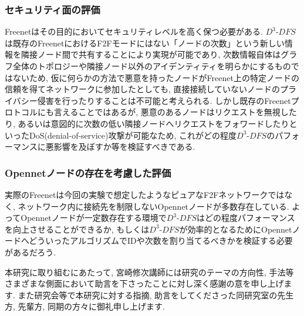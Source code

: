 \documentclass[dvipdfmx]{ampbt}
\begin{document}
\subsubsection*{セキュリティ面の評価}
Freenetはその目的においてセキュリティレベルを高く保つ必要がある. $D^3$-$DFS$は既存のFreenetにおけるF2Fモードにはない「ノードの次数」という新しい情報を隣接ノード間で共有することにより実現が可能であり, 次数情報自体はグラフ全体のトポロジーや隣接ノード以外のアイデンティティを明らかにするものではないため, 仮に何らかの方法で悪意を持ったノードがFreenet上の特定ノードの信頼を得てネットワークに参加したとしても, 直接接続していないノードのプライバシー侵害を行ったりすることは不可能と考えられる. しかし既存のFreenetプロトコルにも言えることではあるが, 悪意のあるノードはリクエストを無視したり, あるいは意図的に次数の低い隣接ノードへリクエストをフォワードしたりといったDoS(denial-of-service)攻撃が可能なため, これがどの程度$D^3$-$DFS$のパフォーマンスに悪影響を及ぼすか等を検証すべきである.

\subsubsection*{Opennetノードの存在を考慮した評価}
実際のFreenetは今回の実験で想定したようなピュアなF2Fネットワークではなく, ネットワーク内に接続先を制限しないOpennetノードが多数存在している. よってOpennetノードが一定数存在する環境で$D^3$-$DFS$はどの程度パフォーマンスを向上させることができるか, もしくは$D^3$-$DFS$が効率的となるためにOpennetノードへどういったアルゴリズムでIDや次数を割り当てるべきかを検証する必要があるだろう. 

\acknowledgment
本研究に取り組むにあたって, 宮崎修次講師には研究のテーマの方向性, 手法等さまざまな側面において助言を下さったことに対し深く感謝の意を申し上げます. また研究会等で本研究に対する指摘, 助言をしてくださった同研究室の先生方, 先輩方, 同期の方々に御礼申し上げます.





\clearpage
\appendix
\end{document}
